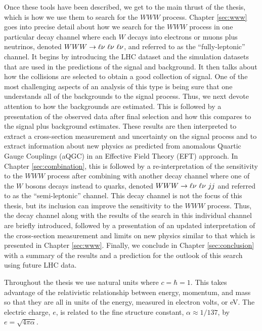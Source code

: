 Once these tools have been described, 
we get to the main thrust of the thesis, which is how we use them to search for the 
$WWW$ process.  Chapter \ref{sec:www} goes into precise detail about how
we search for the $WWW$ process in one particular decay channel where 
each $W$ decays into electrons or muons plus neutrinos,
denoted $WWW\rightarrow \ell\nu~\ell\nu~\ell\nu$, and referred to as the ``fully-leptonic''
channel. It begins
by introducing the LHC
dataset and the simulation datasets that are used in the predictions
of the 
signal and background.
It then talks about how the collisions are selected to obtain a good 
collection of signal.
One of the most challenging aspects of an analysis of this type is 
being sure
that one understands all of the backgrounds to the signal 
process. Thus, we next devote attention 
to how the backgrounds are estimated. This is followed by a presentation of 
the observed
data after final selection and how this compares to the signal plus 
background estimates. 
These results are then interpreted to extract a cross-section
measurement and uncertainty on the signal process and to extract information about
new physics as predicted from anomalous Quartic Gauge Couplings (aQGC)
in an Effective Field Theory (EFT) approach. In Chapter
\ref{sec:combination}, this is 
followed by a re-interpretation of the sensitivity to the $WWW$ process
after combining with another decay channel where one of the $W$ 
bosons  decays instead
to quarks, denoted $WWW\rightarrow \ell\nu~\ell\nu~jj$ and referred to as the ``semi-leptonic'' channel. 
This decay channel is not the focus of this thesis, but its 
inclusion can
improve the sensitivity to the $WWW$ process. Thus, the decay channel along with
the results of the search in this individual channel are briefly 
introduced, followed
by a presentation of an updated interpretation of the cross-section 
measurement and 
limits on new physics similar to that which is presented 
in Chapter \ref{sec:www}.
Finally, we conclude in Chapter \ref{sec:conclusion} with a summary 
of the results and a prediction for the outlook of this search using
future LHC data.

Throughout the thesis we use natural units where $c = \hbar = 1$. 
This takes advantage
of the relativistic relationship between energy, momentum, and mass so that they 
are all in units of the energy, measured in electron volts, or eV. 
The electric charge, $e$, is related
to the fine structure 
constant, $\alpha \approx 1/137$, by $e = \sqrt{4 \pi \alpha}$.


